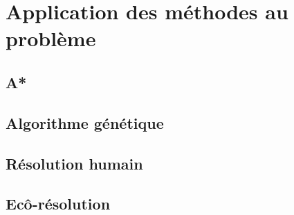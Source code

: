 \chapter{Application des méthodes au problème}
    \section{A*}
    \section{Algorithme génétique}
    \section{Résolution humain}
    \section{Ecô-résolution}
